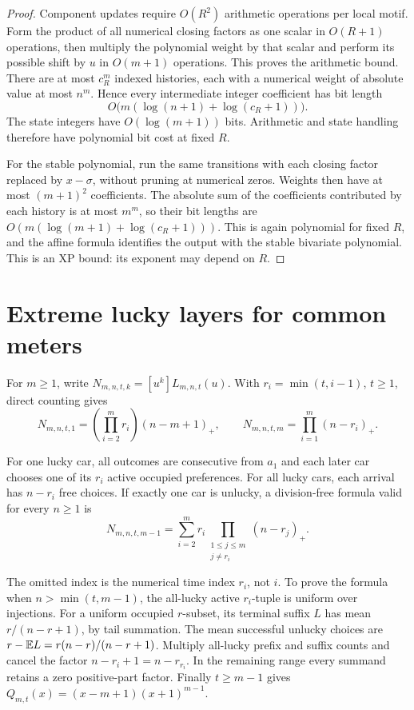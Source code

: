 \documentclass[11pt,a4paper]{article}
\begin{document}
\begin{proof}
Component updates require $O(R^2)$ arithmetic operations per local
motif. Form the product of all numerical closing factors as one
scalar in $O(R+1)$ operations, then multiply the polynomial weight by
that scalar and perform its possible shift by $u$ in $O(m+1)$
operations. This proves the arithmetic bound. There are at most
$c_R^m$ indexed histories, each with a numerical weight of absolute
value at most $n^m$. Hence every intermediate integer coefficient
has bit length
\[
 O\bigl(m(\log(n+1)+\log(c_R+1))\bigr).
\]
The state integers have $O(\log(m+1))$ bits. Arithmetic and state
handling therefore have polynomial bit cost at fixed $R$.

For the stable polynomial, run the same transitions with each closing
factor replaced by $x-\sigma$, without pruning at numerical zeros.
Weights then have at most $(m+1)^2$ coefficients. The absolute sum
of the coefficients contributed by each history is at most $m^m$,
so their bit lengths are
$O(m(\log(m+1)+\log(c_R+1)))$. This is again polynomial for fixed
$R$, and the affine formula identifies the output with the stable
bivariate polynomial. This is an XP bound: its exponent may depend
on $R$.
\end{proof}


\section{Extreme lucky layers for common meters}


For $m\ge1$, write $N_{m,n,t,k}=[u^k]L_{m,n,t}(u)$. With $r_i=\min(t,i-1)$, $t\ge1$, direct counting gives
\[
N_{m,n,t,1}=\left(\prod_{i=2}^m r_i\right)(n-m+1)_+,\qquad
N_{m,n,t,m}=\prod_{i=1}^m(n-r_i)_+.
\]

For one lucky car, all outcomes are consecutive from $a_1$ and each later car chooses one of its $r_i$ active occupied preferences. For all lucky cars, each arrival has $n-r_i$ free choices. If exactly one car is unlucky, a division-free formula valid for every $n\ge1$ is
\[
N_{m,n,t,m-1}=\sum_{i=2}^m r_i\prod_{\substack{1\le j\le m\\j\ne r_i}}(n-r_j)_+.
\]

The omitted index is the numerical time index $r_i$, not $i$. To prove the formula when $n>\min(t,m-1)$, the all-lucky active $r_i$-tuple is uniform over injections. For a uniform occupied $r$-subset, its terminal suffix $L$ has mean $r/(n-r+1)$, by tail summation. The mean successful unlucky choices are $r-\mathbb E L=r(n-r)/(n-r+1)$. Multiply all-lucky prefix and suffix counts and cancel the factor $n-r_i+1=n-r_{r_i}$. In the remaining range every summand retains a zero positive-part factor. Finally $t\ge m-1$ gives $Q_{m,t}(x)=(x-m+1)(x+1)^{m-1}$.
\end{document}
